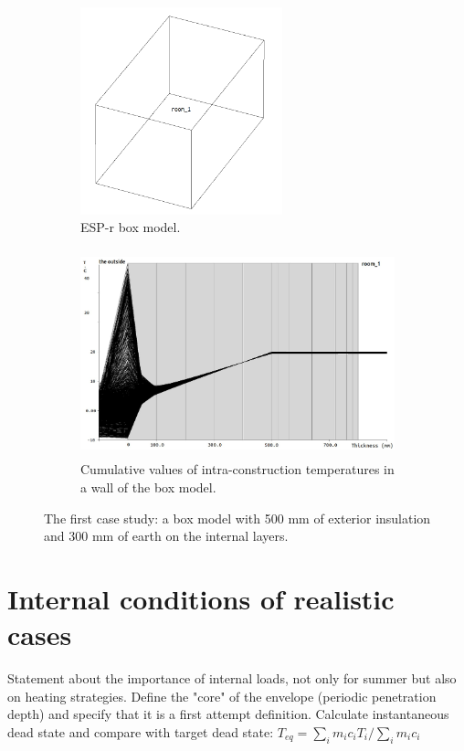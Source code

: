 \documentclass[10pt]{extarticle} %
\begin{document}
 
\begin{figure}[h]
 
\begin{subfigure}{0.35\textwidth}
\includegraphics[width=0.95\linewidth, height=6cm]{images/Dead02_boxModel.png} 
\caption{ESP-r box model.}
\label{fig:esprmodel}
\end{subfigure}
\begin{subfigure}{0.65\textwidth}
\includegraphics[width=0.95\linewidth, height=6cm]{images/01Feb_28Feb_Wall1_dead02_krita.jpg}
\caption{Cumulative values of intra-construction temperatures in a wall of the box model.}
\label{fig:constructionelements}
\end{subfigure}
 
\caption{The first case study: a box model with 500 mm of exterior  insulation and 300 mm of earth on the internal layers.}
\label{fig:casestudy}
\end{figure}


\vskip2cm




\section{Internal conditions of realistic cases} \label{subsec:moreComplex}

Statement about the importance of internal loads, not only for summer but also on heating strategies. Define the "core" of the envelope (periodic penetration depth) and specify that it is a first attempt definition.
Calculate instantaneous dead state and compare with target dead state: $T_{eq}={\sum_i m_i c_i T_i} / {\sum_i m_i c_i}$
\end{document}
